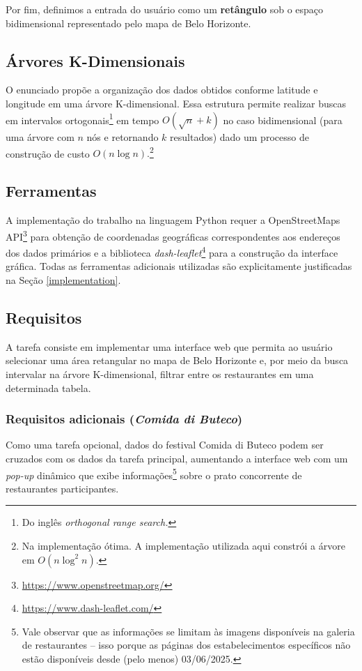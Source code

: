 \documentclass[10pt,a4paper]{article}
\begin{document}
Por fim, definimos a entrada do usuário como um \textbf{retângulo} sob o espaço bidimensional representado pelo mapa de Belo Horizonte.

\subsection{Árvores K-Dimensionais}
\label{kd-trees}
O enunciado propõe a organização dos dados obtidos conforme latitude e longitude em uma árvore K-dimensional. Essa estrutura permite realizar buscas em intervalos ortogonais\footnote{Do inglês \textit{orthogonal range search.}} em tempo $O(\sqrt{n} + k)$ no caso bidimensional (para uma árvore com $n$ nós e retornando $k$ resultados) dado um processo de construção de custo $O(n \log n).  $\footnote{Na implementação ótima. A implementação utilizada aqui constrói a árvore em $O(n \log^2 n)$.}

\subsection{Ferramentas}
\label{tools}
A implementação do trabalho na linguagem Python requer a OpenStreetMaps API\footnote{\url{https://www.openstreetmap.org/}} para obtenção de coordenadas geográficas correspondentes aos endereços dos dados primários e a biblioteca \textit{dash-leaflet}\footnote{\url{https://www.dash-leaflet.com/}} para a construção da interface gráfica. Todas as ferramentas adicionais utilizadas são explicitamente justificadas na Seção \ref{implementation}.


\subsection{Requisitos}
\label{requirements}
A tarefa consiste em implementar uma interface web que permita ao usuário selecionar uma área retangular no mapa de Belo Horizonte e, por meio da busca intervalar na árvore K-dimensional, filtrar entre os restaurantes em uma determinada tabela.

\subsubsection{Requisitos adicionais (\textit{Comida di Buteco})}
Como uma tarefa opcional, dados do festival Comida di Buteco podem ser cruzados com os dados da tarefa principal, aumentando a interface web com um \textit{pop-up} dinâmico que exibe informações\footnote{Vale observar que as informações se limitam às imagens disponíveis na galeria de restaurantes -- isso porque as páginas dos estabelecimentos específicos não estão disponíveis desde (pelo menos) 03/06/2025.} sobre o prato concorrente de restaurantes participantes.
\end{document}
